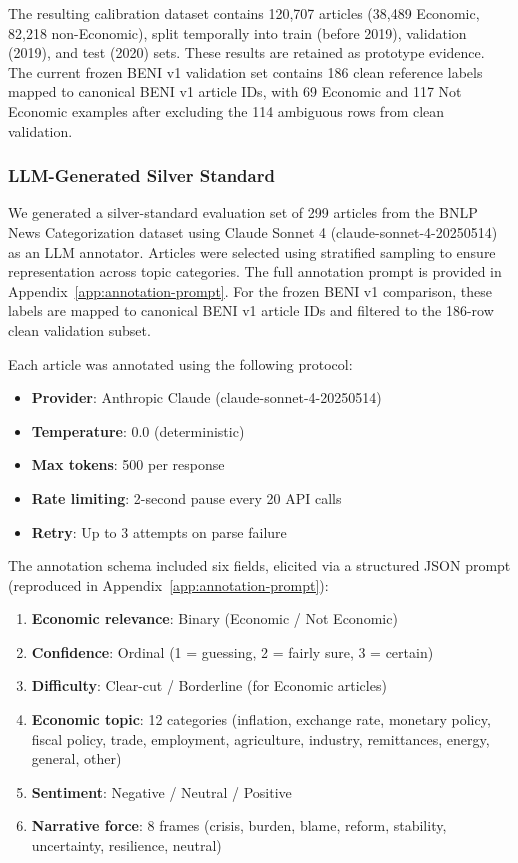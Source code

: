 The resulting calibration dataset contains 120,707 articles (38,489 Economic, 82,218 non-Economic), split temporally into train (before 2019), validation (2019), and test (2020) sets. These results are retained as prototype evidence. The current frozen BENI v1 validation set contains 186 clean reference labels mapped to canonical BENI v1 article IDs, with 69 Economic and 117 Not Economic examples after excluding the 114 ambiguous rows from clean validation.

\subsubsection{LLM-Generated Silver Standard}

We generated a silver-standard evaluation set of 299 articles from the BNLP News Categorization dataset \citep{banglanlp2021} using Claude Sonnet 4 (claude-sonnet-4-20250514) as an LLM annotator. Articles were selected using stratified sampling to ensure representation across topic categories. The full annotation prompt is provided in Appendix~\ref{app:annotation-prompt}. For the frozen BENI v1 comparison, these labels are mapped to canonical BENI v1 article IDs and filtered to the 186-row clean validation subset.

Each article was annotated using the following protocol:

\begin{itemize}
    \item \textbf{Provider}: Anthropic Claude (claude-sonnet-4-20250514)
    \item \textbf{Temperature}: 0.0 (deterministic)
    \item \textbf{Max tokens}: 500 per response
    \item \textbf{Rate limiting}: 2-second pause every 20 API calls
    \item \textbf{Retry}: Up to 3 attempts on parse failure
\end{itemize}

The annotation schema included six fields, elicited via a structured JSON prompt (reproduced in Appendix~\ref{app:annotation-prompt}):

\begin{enumerate}
    \item \textbf{Economic relevance}: Binary (Economic / Not Economic)
    \item \textbf{Confidence}: Ordinal (1 = guessing, 2 = fairly sure, 3 = certain)
    \item \textbf{Difficulty}: Clear-cut / Borderline (for Economic articles)
    \item \textbf{Economic topic}: 12 categories (inflation, exchange rate, monetary policy, fiscal policy, trade, employment, agriculture, industry, remittances, energy, general, other)
    \item \textbf{Sentiment}: Negative / Neutral / Positive
    \item \textbf{Narrative force}: 8 frames (crisis, burden, blame, reform, stability, uncertainty, resilience, neutral)
\end{enumerate}

